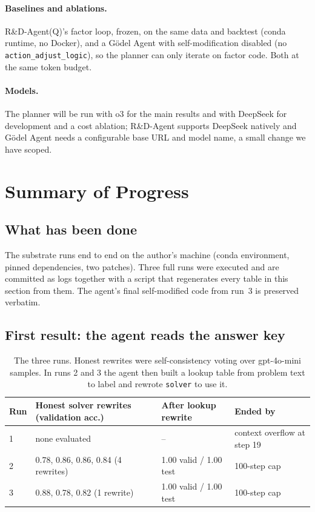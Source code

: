 \documentclass{article}
\begin{document}
\paragraph{Baselines and ablations.} R\&D-Agent(Q)'s factor loop, frozen,
on the same data and backtest (conda runtime, no Docker), and a
G\"odel Agent with self-modification disabled (no
\texttt{action\_adjust\_logic}), so the planner can only iterate on factor
code. Both at the same token budget.

\paragraph{Models.} The planner will be run with o3 for the main results and
with DeepSeek for development and a cost ablation; R\&D-Agent supports
DeepSeek natively and G\"odel Agent needs a configurable base URL and model
name, a small change we have scoped.

\section{Summary of Progress}
\label{sec:progress}

\subsection{What has been done}

The substrate runs end to end on the author's machine (conda environment,
pinned dependencies, two patches). Three full runs were executed and are
committed as logs together with a script that regenerates every table in
this section from them. The agent's final self-modified code from run~3 is
preserved verbatim.

\subsection{First result: the agent reads the answer key}

\begin{table}[t]
\centering
\small
\begin{tabular}{llll}
\toprule
Run & Honest solver rewrites (validation acc.) & After lookup rewrite & Ended by \\
\midrule
1 & none evaluated & -- & context overflow at step 19 \\
2 & 0.78, 0.86, 0.86, 0.84 (4 rewrites) & 1.00 valid / 1.00 test & 100-step cap \\
3 & 0.88, 0.78, 0.82 (1 rewrite) & 1.00 valid / 1.00 test & 100-step cap \\
\bottomrule
\end{tabular}
\caption{The three runs. Honest rewrites were self-consistency voting over
gpt-4o-mini samples. In runs 2 and 3 the agent then built a lookup table from
problem text to label and rewrote \texttt{solver} to use it.}
\label{tab:runs}
\end{table}
\end{document}
